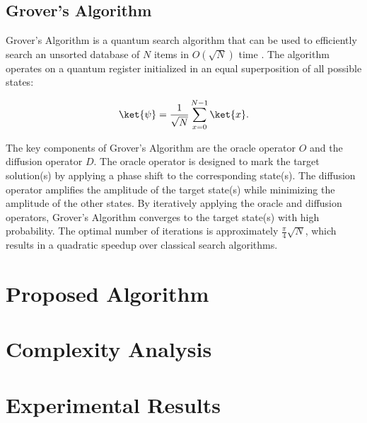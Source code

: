 \subsection{Grover's Algorithm}

Grover's Algorithm is a quantum search algorithm that can be used to efficiently search an unsorted database of $N$ items in $O(\sqrt{N})$ time \cite{Grover1996}. The algorithm operates on a quantum register initialized in an equal superposition of all possible states:

\begin{equation}
\ket{\psi} = \frac{1}{\sqrt{N}}\sum_{x=0}^{N-1}\ket{x}.
\end{equation}

The key components of Grover's Algorithm are the oracle operator $O$ and the diffusion operator $D$. The oracle operator is designed to mark the target solution(s) by applying a phase shift to the corresponding state(s). The diffusion operator amplifies the amplitude of the target state(s) while minimizing the amplitude of the other states. By iteratively applying the oracle and diffusion operators, Grover's Algorithm converges to the target state(s) with high probability. The optimal number of iterations is approximately $\frac{\pi}{4}\sqrt{N}$, which results in a quadratic speedup over classical search algorithms.

\section{Proposed Algorithm}
\label{sec:proposed_algorithm}


\section{Complexity Analysis}
\label{sec:complexity_analysis}


\section{Experimental Results}
\label{sec:experimental_results}


